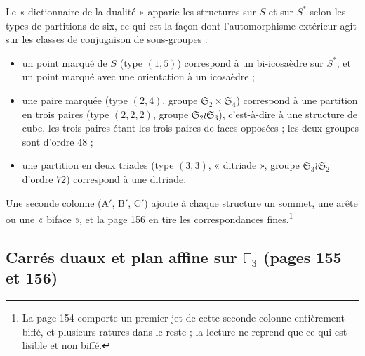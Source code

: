 \documentclass[11pt,a4paper]{article}
\begin{document}
Le « dictionnaire de la dualité » apparie les structures sur $S$ et sur
$S^*$ selon les types de partitions de six, ce qui est la façon dont
l'automorphisme extérieur agit sur les classes de conjugaison de sous-groupes :
\begin{itemize}
\item un point marqué de $S$ (type $(1,5)$) correspond à un bi-icosaèdre sur
  $S^*$, et un point marqué avec une orientation à un icosaèdre ;
\item une paire marquée (type $(2,4)$, groupe $\mathfrak{S}_2 \times
  \mathfrak{S}_4$) correspond à une partition en trois paires (type $(2,2,2)$,
  groupe $\mathfrak{S}_2 \wr \mathfrak{S}_3$), c'est-à-dire à une structure de
  cube, les trois paires étant les trois paires de faces opposées ; les deux
  groupes sont d'ordre $48$ ;
\item une partition en deux triades (type $(3,3)$, « ditriade », groupe
  $\mathfrak{S}_3 \wr \mathfrak{S}_2$ d'ordre $72$) correspond à une
  ditriade.
\end{itemize}
Une seconde colonne (A$'$, B$'$, C$'$) ajoute à chaque structure un sommet,
une arête ou une « biface », et la page 156 en tire les correspondances
fines.\footnote{La page 154 comporte un premier jet de cette seconde colonne
entièrement biffé, et plusieurs ratures dans le reste ; la lecture ne reprend
que ce qui est lisible et non biffé.}

\subsection*{Carrés duaux et plan affine sur $\mathbb{F}_3$ (pages 155 et 156)}
\end{document}
